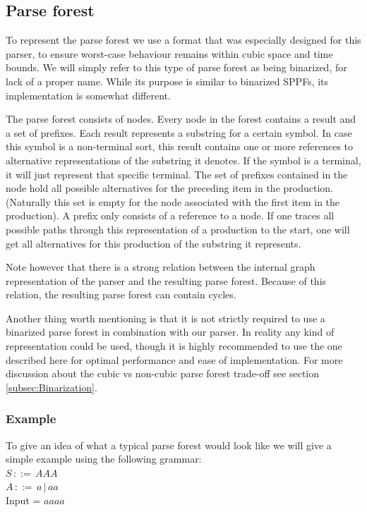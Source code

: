 \documentclass[a4paper,10pt]{article}
\begin{document}
\subsection{Parse forest}

To represent the parse forest we use a format that was especially designed for this parser, to ensure worst-case behaviour remains within cubic space and time bounds. We will simply refer to this type of parse forest as being binarized, for lack of a proper name. While its purpose is similar to binarized SPPFs, its implementation is somewhat different.

The parse forest consists of nodes. Every node in the forest contains a result and a set of prefixes. Each result represents a substring for a certain symbol. In case this symbol is a non-terminal sort, this result contains one or more references to alternative representations of the substring it denotes. If the symbol is a terminal, it will just represent that specific terminal. The set of prefixes contained in the node hold all possible alternatives for the preceding item in the production. (Naturally this set is empty for the node associated with the first item in the production). A prefix only consists of a reference to a node. If one traces all possible paths through this representation of a production to the start, one will get all alternatives for this production of the substring it represents.

Note however that there is a strong relation between the internal graph representation of the parser and the resulting parse forest. Because of this relation, the resulting parse forest can contain cycles.

Another thing worth mentioning is that it is not strictly required to use a binarized parse forest in combination with our parser. In reality any kind of representation could be used, though it is highly recommended to use the one described here for optimal performance and ease of implementation. For more discussion about the cubic vs non-cubic parse forest trade-off see section \ref{subsec:Binarization}.

\subsubsection{Example}
To give an idea of what a typical parse forest would look like we will give a simple example using the following grammar:\\
$S\,::=\,AAA$\\
$A\,::=\,a\,|\,aa$\\
Input = $aaaa$
\end{document}
